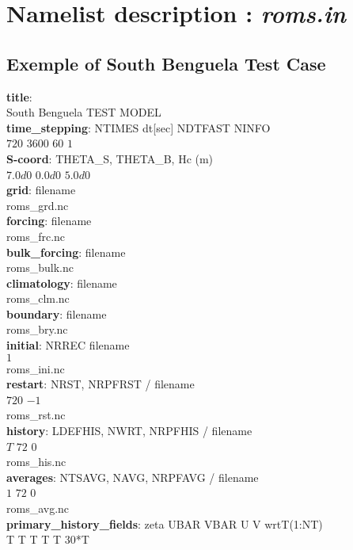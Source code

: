 \section{Namelist description : \textit{roms.in}}\label{namelistdesc}

\subsection{Exemple of South Benguela Test Case}
\textbf{title}: \\
South Benguela TEST MODEL \\
\textbf{time\_stepping}: NTIMES   dt[sec]  NDTFAST  NINFO \\
$720$      $3600$     $60$      $1$ \\
\textbf{S-coord}: THETA\_S,   THETA\_B,    Hc (m) \\
$7.0d0$      $0.0d0$      $5.0d0$ \\
\textbf{grid}:  filename \\
roms\_grd.nc \\
\textbf{forcing}: filename \\
roms\_frc.nc \\
\textbf{bulk\_forcing}: filename \\
roms\_bulk.nc \\
\textbf{climatology}: filename \\
roms\_clm.nc\\
\textbf{boundary}: filename \\
roms\_bry.nc \\
\textbf{initial}: NRREC  filename \\
$1$  \\
roms\_ini.nc \\
\textbf{restart}:          NRST, NRPFRST / filename \\
$720$    $-1$ \\
roms\_rst.nc \\
\textbf{history}: LDEFHIS, NWRT, NRPFHIS / filename  \\
$T$      $72$     $0$ \\
roms\_his.nc \\
\textbf{averages}: NTSAVG, NAVG, NRPFAVG / filename \\
$1$      $72$     $0$ \\
roms\_avg.nc \\
\textbf{primary\_history\_fields}: zeta UBAR VBAR  U  V   wrtT(1:NT) \\
T    T   T   T  T    $30$*T \\
